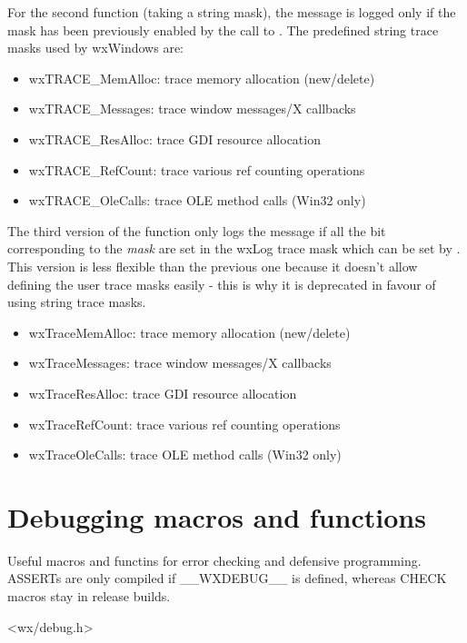 For the second function (taking a string mask), the message is logged only if
the mask has been previously enabled by the call to 
. The predefined string trace masks
used by wxWindows are:

\begin{itemize}\itemsep=0pt
\item wxTRACE\_MemAlloc: trace memory allocation (new/delete)
\item wxTRACE\_Messages: trace window messages/X callbacks
\item wxTRACE\_ResAlloc: trace GDI resource allocation
\item wxTRACE\_RefCount: trace various ref counting operations
\item wxTRACE\_OleCalls: trace OLE method calls (Win32 only)
\end{itemize}

The third version of the function only logs the message if all the bit
corresponding to the {\it mask} are set in the wxLog trace mask which can be
set by . This version is less
flexible than the previous one because it doesn't allow defining the user
trace masks easily - this is why it is deprecated in favour of using string
trace masks.

\begin{itemize}\itemsep=0pt
\item wxTraceMemAlloc: trace memory allocation (new/delete)
\item wxTraceMessages: trace window messages/X callbacks
\item wxTraceResAlloc: trace GDI resource allocation
\item wxTraceRefCount: trace various ref counting operations
\item wxTraceOleCalls: trace OLE method calls (Win32 only)
\end{itemize}

\section{Debugging macros and functions}\label{debugmacros}

Useful macros and functins for error checking and defensive programming. ASSERTs are only
compiled if \_\_WXDEBUG\_\_ is defined, whereas CHECK macros stay in release
builds.


<wx/debug.h>


